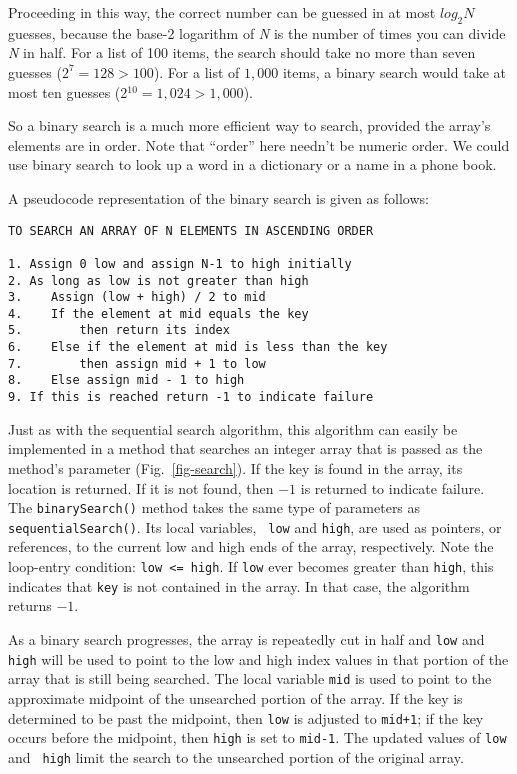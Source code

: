 Proceeding in this way, the correct number can be guessed in at most
$log_2 N$ guesses, because the base-2 logarithm of {\it N} is the
number of times you can divide {\it N} in half.  For a list of 100
items, the search should take no more than seven guesses ($2^7 = 128
> 100$). For a list of $1,000$ items, a binary search would take at most
ten guesses (2$^{10}=1,024>1,000$).

So a binary search is a much more efficient way to search, provided
the array's elements are in order.  Note that ``order'' here needn't be
numeric order.  We could use binary search to look up a word in a
dictionary or a name in a phone book.

\noindent A pseudocode representation of the binary search is given
as follows:

\begin{jjjlisting}
\begin{lstlisting}
TO SEARCH AN ARRAY OF N ELEMENTS IN ASCENDING ORDER

1. Assign 0 low and assign N-1 to high initially
2. As long as low is not greater than high
3.    Assign (low + high) / 2 to mid
4.    If the element at mid equals the key
5.        then return its index
6.    Else if the element at mid is less than the key
7.        then assign mid + 1 to low
8.    Else assign mid - 1 to high
9. If this is reached return -1 to indicate failure
\end{lstlisting}
\end{jjjlisting}

\noindent Just as with the sequential search algorithm,
this algorithm can easily be implemented in a method that searches an
integer array that is passed as the method's parameter
(Fig.~\ref{fig-search}). If the key is found in the array, its
location is returned.  If it is not found, then $-1$ is returned to
indicate failure.  The {\tt binarySearch()} method takes the same type
of parameters as {\tt sequentialSearch()}. Its local variables, {\tt
low} and {\tt high}, are used as pointers, or references, to the
current low and high ends of the array, respectively.  Note the
loop-entry condition: \verb|low <= high|. If {\tt low} ever becomes
greater than {\tt high}, this indicates that {\tt key} is not
contained in the array.  In that case, the algorithm returns $-1$.

As a binary search progresses, the array is repeatedly cut in half and
{\tt low} and {\tt high} will be used to point to the low and high
index values in that portion of the array that is still being
searched.  The local variable {\tt mid} is used to point to the
approximate midpoint of the unsearched portion of the array.  If the
key is determined to be past the midpoint, then {\tt low} is adjusted
to {\tt mid+1}; if the key occurs before the midpoint, then {\tt high}
is set to \verb|mid-1|.  The updated values of {\tt low} and {\tt
high} limit the search to the unsearched portion of the original
array.

